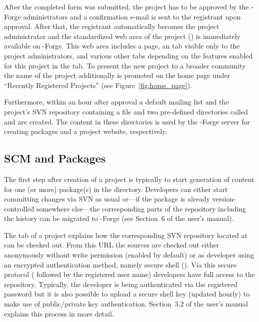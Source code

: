 After the completed form was submitted, the project has to be approved
by the \R{}-Forge administrators and a confirmation e-mail is sent to the
registrant upon approval. After that, the registrant automatically
becomes the project administrator and the standardized web area of the
project () is
immediately available on \R{}-Forge. 
This web area includes a  page, an  tab
visible only to the project administrators, and various other tabs
depending on the features enabled for this project in the 
tab. To present the new project to a broader community the name of the
project additionally is promoted on the home page under ``Recently
Registered Projects'' (see Figure~\ref{fig:home_page}).

Furthermore, within an hour after approval a default mailing list and
the project's SVN repository containing a  file and two
pre-defined directories called  and  are created. 
The content in these directories is used by the \R{}-Forge server
for creating \R{} packages and a project website, respectively.


\subsection{SCM and \R{} Packages}

The first step after creation of a project is typically to start
generation of content for one (or more) \R{} package(s) in the 
directory. Developers can either start committing changes via SVN as usual
or---if the package is already version-controlled somewhere else---the
corresponding parts of the repository including the history can be 
migrated to \R{}-Forge (see Section~6 of the user's manual).

The  tab of a project explains how the corresponding SVN
repository located at 
can be checked out. From
this URL the sources are checked out either 
anonymously without write permission (enabled by default) or as
developer using an encrypted authentication method, namely secure
shell (). Via this secure protocol (
followed by the registered user name) developers have full access to the
repository. Typically, the developer is being authenticated via the
registered password but it is also possible to upload a secure shell
key (updated hourly) to make use of public/private key
authentication. Section~3.2 of the user's manual explains this process
in more detail.

